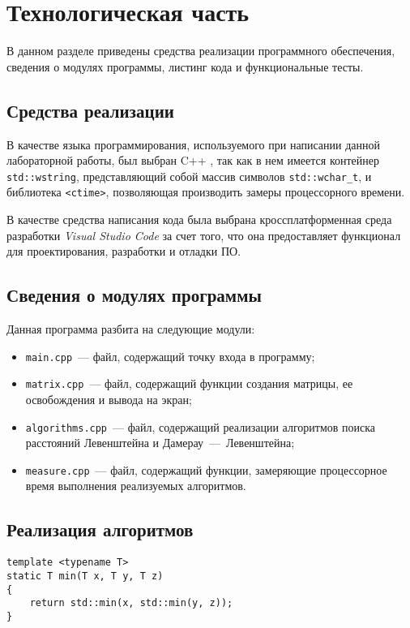 \chapter{Технологическая часть}

В данном разделе приведены средства реализации программного обеспечения, сведения о модулях программы, листинг кода и функциональные тесты.

\section{Средства реализации}

В качестве языка программирования, используемого при написании данной лабораторной работы, был выбран C++ \cite{cpp-lang}, так как в нем имеется контейнер \texttt{std::wstring}, представляющий собой массив символов \texttt{std::wchar\_t}, и библиотека \texttt{<ctime>}, позволяющая производить замеры процессорного времени.

В качестве средства написания кода была выбрана кроссплатформенная среда разработки \textit{Visual Studio Code} за счет того, что она предоставляет функционал для проектирования, разработки и отладки ПО.

\section{Сведения о модулях программы}

Данная программа разбита на следующие модули:

\begin{itemize}
    \item \texttt{main.cpp}~--- файл, содержащий точку входа в программу;
    \item \texttt{matrix.cpp}~--- файл, содержащий функции создания матрицы, ее освобождения и вывода на экран;
    \item \texttt{algorithms.cpp}~--- файл, содержащий реализации алгоритмов поиска расстояний Левенштейна и Дамерау~---~Левенштейна;
    \item \texttt{measure.cpp}~--- файл, содержащий функции, замеряющие процессорное время выполнения реализуемых алгоритмов.
\end{itemize}

\section{Реализация алгоритмов}

\begin{lstlisting}[caption={Функция \texttt{min}, используемая в реализациях алгоритмов}]
template <typename T>
static T min(T x, T y, T z)
{
    return std::min(x, std::min(y, z));
}
\end{lstlisting}

